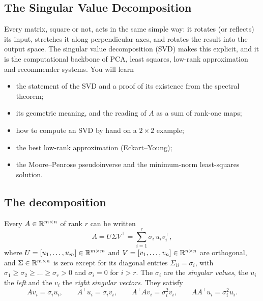 \begin{notechapter}
\chapter{The Singular Value Decomposition}\label{ch:svd}

\begin{chapterintro}
Every matrix, square or not, acts in the same simple way: it rotates (or reflects)
its input, stretches it along perpendicular axes, and rotates the result into the
output space. The singular value decomposition (SVD) makes this explicit, and it is
the computational backbone of PCA, least squares, low-rank approximation and
recommender systems. You will learn
\begin{itemize}[nosep]
  \item the statement of the SVD and a proof of its existence from the spectral
        theorem;
  \item its geometric meaning, and the reading of $A$ as a sum of rank-one maps;
  \item how to compute an SVD by hand on a $2\times2$ example;
  \item the best low-rank approximation (Eckart--Young);
  \item the Moore--Penrose pseudoinverse and the minimum-norm least-squares
        solution.
\end{itemize}
\end{chapterintro}

\section{The decomposition}\label{svd:sec:statement}

\begin{theorem}\label{svd:thm:svd}
Every $A\in\mathbb{R}^{m\times n}$ of rank $r$ can be written
\[
  A = U\Sigma V^\top = \sum_{i=1}^r\sigma_i\,u_iv_i^\top,
\]
where $U = [u_1,\dots,u_m]\in\mathbb{R}^{m\times m}$ and $V = [v_1,\dots,v_n]\in\mathbb{R}^{n\times n}$ are
orthogonal, and $\Sigma\in\mathbb{R}^{m\times n}$ is zero except for its diagonal entries
$\Sigma_{ii} = \sigma_i$, with $\sigma_1\geq\sigma_2\geq\dots\geq\sigma_r>0$ and $\sigma_i = 0$
for $i>r$. The $\sigma_i$ are the \emph{singular values}, the $u_i$ the \emph{left} and the
$v_i$ the \emph{right singular vectors}. They satisfy
\[
  Av_i = \sigma_iu_i,\qquad A^\top u_i = \sigma_iv_i,\qquad
  A^\top Av_i = \sigma_i^2v_i,\qquad AA^\top u_i = \sigma_i^2u_i .
\]
\end{theorem}


\end{notechapter}
